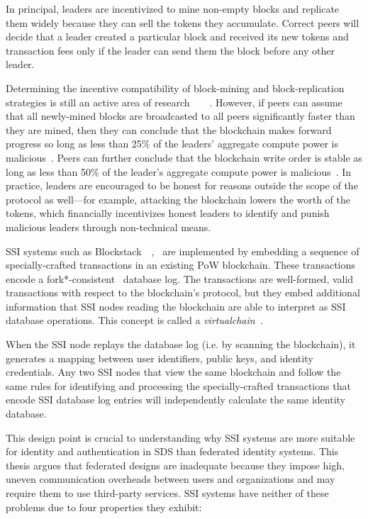 In principal, leaders are incentivized to mine non-empty blocks and replicate them widely
because they can sell the tokens they accumulate.  Correct peers will 
decide that a leader created a particular block and received its new tokens and
transaction fees only if the leader can send them the block before any other leader. 

Determining the incentive compatibility of block-mining and block-replication
strategies is still an active area of
research~\cite{ghost-mining}~\cite{stubborn-mining}~\cite{on-blockchain-decentralization}~\cite{bitcoin-incentive-compatibility}.
However, if peers can assume that all newly-mined blocks are broadcasted to all peers
significantly faster than they are mined, then they can conclude that the
blockchain makes forward progress so long as less than 25\% of the leaders'
aggregate compute power is malicious~\cite{selfish-mining}.  Peers can further
conclude that the blockchain write order is stable as long as less than 50\% of
the leader's aggregate compute power is malicious~\cite{bitcoin}.  In practice,
leaders are encouraged to be honest for reasons outside the scope of the
protocol as well---for example, attacking the blockchain lowers the worth of the
tokens, which financially incentivizes honest leaders to identify and punish
malicious leaders through non-technical means.

SSI systems such as
Blockstack~\cite{blockstack}~\cite{ali2017},~\cite{blockstack-whitepaper}
are implemented by embedding a sequence of specially-crafted transactions
in an existing PoW blockchain.  These transactions encode a
fork*-consistent~\cite{fork-star-consistent} database log.  The transactions are
well-formed, valid transactions with respect to the blockchain's protocol,
but they embed additional information that SSI nodes reading the blockchain
are able to interpret as SSI database operations.  This concept is called
a \emph{virtualchain}~\cite{virtualchain}.

When the SSI node replays the database log (i.e. by scanning the blockchain), it
generates a mapping between user identifiers, public keys, and identity
credentials.  Any two SSI nodes that view the same blockchain and follow the
same rules for identifying and processing the specially-crafted transactions
that encode SSI database log entries will independently
calculate the same identity database.

This design point is crucial to understanding why SSI systems are
more suitable for identity and authentication in SDS than federated identity
systems.  This thesis argues that federated designs are inadequate because they
impose high, uneven communication overheads between users and organizations and
may require them to use third-party services.  SSI systems have neither of these
problems due to four properties they exhibit:

